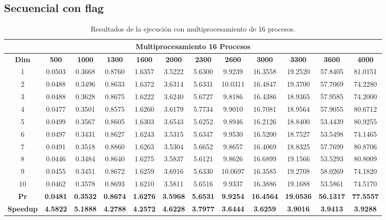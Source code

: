 \documentclass{article}
\begin{document}

\subsection{Secuencial con flag}

\begin{table}[H]
\centering
\tiny
\begin{tabular}{|c|c|c|c|c|c|c|c|c|c|c|c|}
\hline
\multicolumn{12}{|c|}{\textbf{Multiprocesamiento 16 Procesos}} \\
\hline
\textbf{Dim} & \textbf{500} & \textbf{1000} & \textbf{1300} & \textbf{1600} & \textbf{2000} & \textbf{2300} & \textbf{2600} & \textbf{3000} & \textbf{3300} & \textbf{3600} & \textbf{4000} \\
\hline
1  & 0.0503 & 0.3668 & 0.8760 & 1.6357 & 3.5222 & 5.6300 & 9.9239 & 16.3558 & 19.2520 & 57.8405 & 81.0151 \\
2  & 0.0488 & 0.3496 & 0.8633 & 1.6372 & 3.6314 & 5.6331 & 10.0311 & 16.4847 & 19.3700 & 57.7069 & 74.2280 \\
3  & 0.0488 & 0.3628 & 0.8675 & 1.6222 & 3.6240 & 5.6727 & 9.8186 & 16.4386 & 18.9365 & 57.9585 & 74.2000 \\
4  & 0.0477 & 0.3501 & 0.8575 & 1.6260 & 3.6179 & 5.7734 & 9.9010 & 16.7081 & 18.9564 & 57.9055 & 80.6712 \\
5  & 0.0499 & 0.3567 & 0.8605 & 1.6303 & 3.6543 & 5.6252 & 9.8946 & 16.2126 & 18.8400 & 53.4439 & 80.9255 \\
6  & 0.0497 & 0.3431 & 0.8627 & 1.6243 & 3.5315 & 5.6347 & 9.9530 & 16.5200 & 18.7527 & 53.5498 & 74.1465 \\
7  & 0.0491 & 0.3518 & 0.8860 & 1.6263 & 3.5304 & 5.6652 & 9.8657 & 16.4069 & 18.8325 & 57.7699 & 80.8706 \\
8  & 0.0446 & 0.3484 & 0.8640 & 1.6275 & 3.5837 & 5.6121 & 9.8626 & 16.6899 & 19.1566 & 53.5293 & 80.8009 \\
9  & 0.0455 & 0.3451 & 0.8672 & 1.6259 & 3.6916 & 5.6330 & 10.0697 & 16.3585 & 19.2708 & 58.0269 & 74.1820 \\
10 & 0.0462 & 0.3578 & 0.8693 & 1.6210 & 3.5811 & 5.6516 & 9.9337 & 16.3886 & 19.1688 & 53.5861 & 74.5170 \\
\hline
\textbf{Pr} & \textbf{0.0481} & \textbf{0.3532} & \textbf{0.8674} & \textbf{1.6276} & \textbf{3.5968} & \textbf{5.6531} & \textbf{9.9254} & \textbf{16.4564} & \textbf{19.0536} & \textbf{56.1317} & \textbf{77.5557} \\
\hline
\textbf{Speedup} & \textbf{4.5822} & \textbf{5.1888} & \textbf{4.2788} & \textbf{4.2572} & \textbf{4.6228} & \textbf{3.7977} & \textbf{3.6444} & \textbf{3.6259} & \textbf{3.9016} & \textbf{3.9413} & \textbf{3.9288} \\
\hline
\end{tabular}
\label{tab:mp16}
\caption{Resultados de la ejecución con multiprocesamiento de 16 procesos.}
\end{table}
\end{document}

